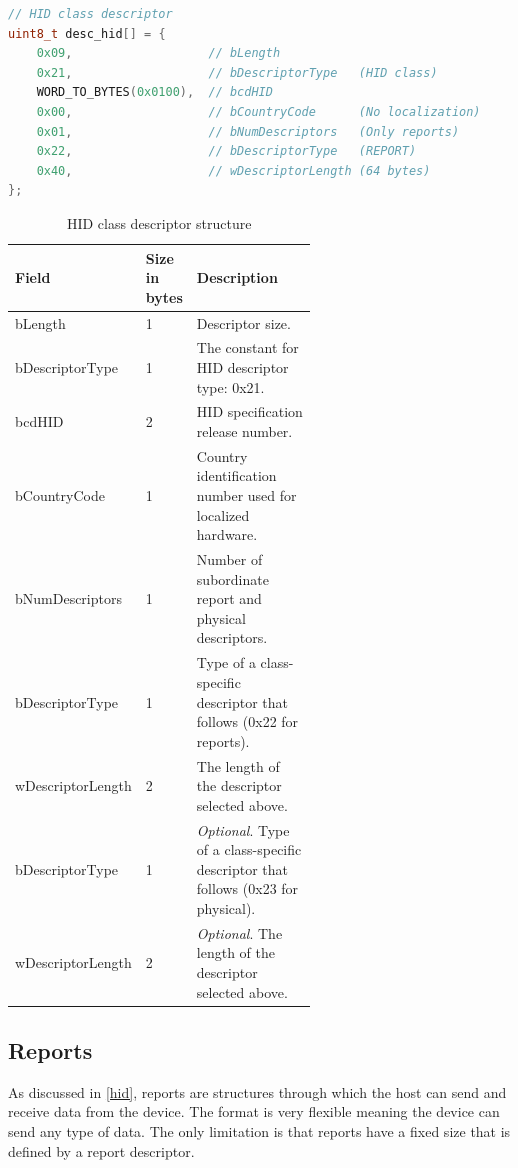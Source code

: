 \begin{lstlisting}[caption={Example of HID class descriptor in C language},
                   label={lst:hid_example},
                   language=c]
// HID class descriptor
uint8_t desc_hid[] = {
    0x09,                   // bLength
    0x21,                   // bDescriptorType   (HID class)
    WORD_TO_BYTES(0x0100),  // bcdHID
    0x00,                   // bCountryCode      (No localization)
    0x01,                   // bNumDescriptors   (Only reports)
    0x22,                   // bDescriptorType   (REPORT)
    0x40,                   // wDescriptorLength (64 bytes)
};
\end{lstlisting}
\begin{table}[ht]
    \centering
    \begin{tabular}{|l|l|p{0.6\linewidth}|} \hline
         \textbf{Field}     &  \thead{\textbf{Size} \\ \textbf{in bytes}} & \textbf{Description} \\ \hline
         bLength            & 1 & Descriptor size. \\ \hline
         bDescriptorType    & 1 & The constant for HID descriptor type: 0x21. \\ \hline
         bcdHID             & 2 & HID specification release number. \\ \hline
         bCountryCode       & 1 & Country identification number used for localized hardware. \\ \hline
         bNumDescriptors    & 1 & Number of subordinate report and physical descriptors. \\ \hline
         bDescriptorType    & 1 & Type of a class-specific descriptor that follows (0x22 for reports). \\ \hline
         wDescriptorLength  & 2 & The length of the descriptor selected above. \\ \hline
         bDescriptorType    & 1 & \emph{Optional}. Type of a class-specific descriptor that follows (0x23 for physical). \\ \hline
         wDescriptorLength  & 2 & \emph{Optional}. The length of the descriptor selected above. \\ \hline
    \end{tabular}
    \caption{HID class descriptor structure}
    \label{tab:hid_descriptor}
\end{table}

\newpage
\subsection*{Reports}
\label{reports}
As discussed in \autoref{hid}, reports are structures through which the host can send and receive data from the device. The format is very flexible meaning the device can send any type of data. The only limitation is that reports have a fixed size that is defined by a report descriptor.

